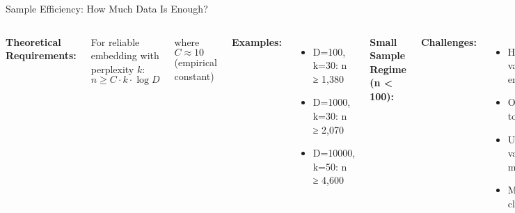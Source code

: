 \documentclass[aspectratio=169]{beamer}
\begin{document}
\begin{frame}{Sample Efficiency: How Much Data Is Enough?}
\begin{columns}
\textbf{Theoretical Requirements:}

For reliable embedding with perplexity $k$:
  $n \geq C \cdot k \cdot \log D$
  
  where $C \approx 10$ (empirical constant)

\textbf{Examples:}
\begin{itemize}
\item D=100, k=30: n ≥ 1,380
\item D=1000, k=30: n ≥ 2,070
\item D=10000, k=50: n ≥ 4,600
\end{itemize}

\textbf{Small Sample Regime (n < 100):}

\textbf{Challenges:}
\begin{itemize}
\item High variance embeddings
\item Overfitting to noise
\item Unreliable validation metrics
\item Meaningless clusters
\end{itemize}

\textbf{Adaptations:}
\begin{itemize}
\item Lower perplexity (5-10)
\item More regularization
\item Bootstrap validation
\item Cautious interpretation
\end{itemize}

\end{columns}
\end{frame}
\end{document}
